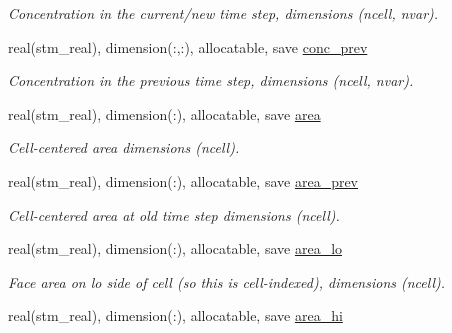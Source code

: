 \begin{CompactItemize}
\begin{CompactList}\small\item\em Concentration in the current/new time step, dimensions (ncell, nvar). \item\end{CompactList}\item 
\hypertarget{a00070_c5e709ec4fbebcf80f52404fb943d089}{
real(stm\_\-real), dimension(:,:), allocatable, save \hyperlink{a00070_c5e709ec4fbebcf80f52404fb943d089}{conc\_\-prev}}
\label{a00070_c5e709ec4fbebcf80f52404fb943d089}

\begin{CompactList}\small\item\em Concentration in the previous time step, dimensions (ncell, nvar). \item\end{CompactList}\item 
\hypertarget{a00070_274f07b499471ef0f42864da7514b955}{
real(stm\_\-real), dimension(:), allocatable, save \hyperlink{a00070_274f07b499471ef0f42864da7514b955}{area}}
\label{a00070_274f07b499471ef0f42864da7514b955}

\begin{CompactList}\small\item\em Cell-centered area dimensions (ncell). \item\end{CompactList}\item 
\hypertarget{a00070_f8f1f7a922748c46f2a9b7082069d8bc}{
real(stm\_\-real), dimension(:), allocatable, save \hyperlink{a00070_f8f1f7a922748c46f2a9b7082069d8bc}{area\_\-prev}}
\label{a00070_f8f1f7a922748c46f2a9b7082069d8bc}

\begin{CompactList}\small\item\em Cell-centered area at old time step dimensions (ncell). \item\end{CompactList}\item 
\hypertarget{a00070_e1662ffe907bb079f12f4f1f3cbb39f4}{
real(stm\_\-real), dimension(:), allocatable, save \hyperlink{a00070_e1662ffe907bb079f12f4f1f3cbb39f4}{area\_\-lo}}
\label{a00070_e1662ffe907bb079f12f4f1f3cbb39f4}

\begin{CompactList}\small\item\em Face area on lo side of cell (so this is cell-indexed), dimensions (ncell). \item\end{CompactList}\item 
\hypertarget{a00070_3c70bfe7910bcbe1ed43586c499a31dd}{
real(stm\_\-real), dimension(:), allocatable, save \hyperlink{a00070_3c70bfe7910bcbe1ed43586c499a31dd}{area\_\-hi}}
\label{a00070_3c70bfe7910bcbe1ed43586c499a31dd}


\end{CompactItemize}
